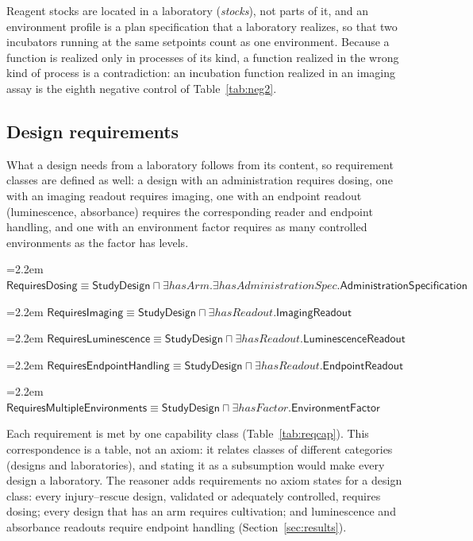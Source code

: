 \documentclass[10pt,a4paper]{article}
\newcommand{\ax}[1]{\par{\raggedright\noindent\hangindent=2.2em\hangafter=1 $#1$\par}\smallskip}
\begin{document}
Reagent stocks are located in a laboratory (\textit{stocks}), not parts of it, and an environment profile is a plan
specification that a laboratory realizes, so that two incubators running at the same setpoints count as one
environment. Because a function is realized only in processes of its kind, a function realized in the wrong kind of
process is a contradiction: an incubation function realized in an imaging assay is the eighth negative control of
Table~\ref{tab:neg2}.

\subsection{Design requirements}
What a design needs from a laboratory follows from its content, so requirement classes are defined as well: a design
with an administration requires dosing, one with an imaging readout requires imaging, one with an endpoint readout
(luminescence, absorbance) requires the corresponding reader and endpoint handling, and one with an environment factor
requires as many controlled environments as the factor has levels.

\ax{\mathsf{RequiresDosing} ≡ \mathsf{StudyDesign} ⊓\allowbreak ∃\mathit{hasArm}.∃\mathit{hasAdministrationSpec}.\mathsf{AdministrationSpecification}}
\ax{\mathsf{RequiresImaging} ≡ \mathsf{StudyDesign} ⊓\allowbreak ∃\mathit{hasReadout}.\mathsf{ImagingReadout}}
\ax{\mathsf{RequiresLuminescence} ≡ \mathsf{StudyDesign} ⊓\allowbreak ∃\mathit{hasReadout}.\mathsf{LuminescenceReadout}}
\ax{\mathsf{RequiresEndpointHandling} ≡ \mathsf{StudyDesign} ⊓\allowbreak ∃\mathit{hasReadout}.\mathsf{EndpointReadout}}
\ax{\mathsf{RequiresMultipleEnvironments} ≡ \mathsf{StudyDesign} ⊓\allowbreak ∃\mathit{hasFactor}.\mathsf{EnvironmentFactor}}

Each requirement is met by one capability class (Table~\ref{tab:reqcap}). This correspondence is a table, not an
axiom: it relates classes of different categories (designs and laboratories), and stating it as a subsumption would
make every design a laboratory. The reasoner adds requirements no axiom states for a design class: every injury--rescue
design, validated or adequately controlled, requires dosing; every design that has an arm requires cultivation; and
luminescence and absorbance readouts require endpoint handling (Section~\ref{sec:results}).
\end{document}
